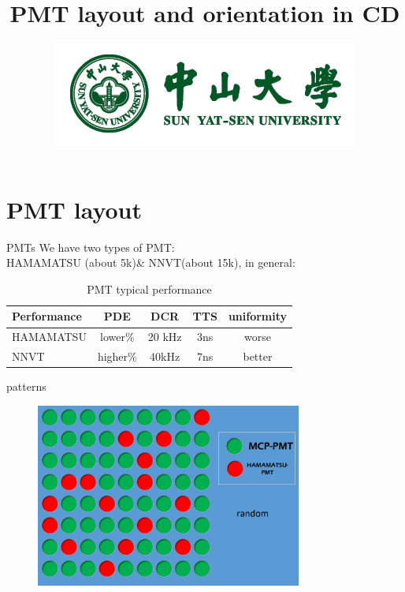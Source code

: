 \documentclass[11pt,compress,xcolor=x11names,UTF8]{beamer}
\title{PMT layout and orientation in CD}
\author[Rong. Zhao]{Email：zhaor25@mail2.sysu.edu.cn \and  } %
\institute[Sun Yat-Sen University]{School of Physics\and } %
\date[\today]{\includegraphics[width=.5\textwidth]{logo}}
\begin{document}
\maketitle


\section{PMT layout}


\begin{frame}{PMTs}
We have two types of PMT:\\ HAMAMATSU (about 5k)\& NNVT(about 15k), in general:
\begin{table}[]  
\caption{PMT typical performance}  
\begin{tabular*}{.98\textwidth}{l|cccc}
\hline  
\hline  
Performance & PDE &DCR & TTS& uniformity \\  
\hline  
HAMAMATSU &  lower\% & 20 kHz& 3ns& worse \\  
NNVT  & higher\% & 40kHz & 7ns& better \\  
\hline  
\end{tabular*}  
\end{table} 

\end{frame}
\begin{frame}{patterns}
\begin{figure}
\centering
\includegraphics[width=0.78\textwidth]{random} %
\end{figure}

\end{frame}
\end{document}
